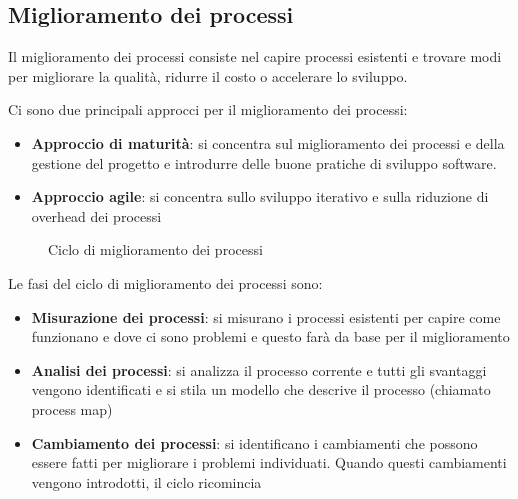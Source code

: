 \documentclass[a4paper]{article}
\begin{document}
\subsection{Miglioramento dei processi}
Il miglioramento dei processi consiste nel capire processi esistenti e trovare modi
per migliorare la qualità, ridurre il costo o accelerare lo sviluppo.

Ci sono due principali approcci per il miglioramento dei processi:
\begin{itemize}
  \item \textbf{Approccio di maturità}: si concentra sul miglioramento dei processi
    e della gestione del progetto e introdurre delle buone pratiche di sviluppo software.
  \item \textbf{Approccio agile}: si concentra sullo sviluppo iterativo e sulla riduzione
    di overhead dei processi
\end{itemize}

\begin{figure}[H]
  \centering
  \caption{Ciclo di miglioramento dei processi}
\end{figure}
Le fasi del ciclo di miglioramento dei processi sono:
\begin{itemize}
  \item \textbf{Misurazione dei processi}: si misurano i processi esistenti per capire
    come funzionano e dove ci sono problemi e questo farà da base per il miglioramento
  \item \textbf{Analisi dei processi}: si analizza il processo corrente e tutti gli
    svantaggi vengono identificati e si stila un modello che descrive il processo
    (chiamato process map)
  \item \textbf{Cambiamento dei processi}: si identificano i cambiamenti che possono
    essere fatti per migliorare i problemi individuati. Quando questi cambiamenti vengono
    introdotti, il ciclo ricomincia
\end{itemize}
\end{document}
